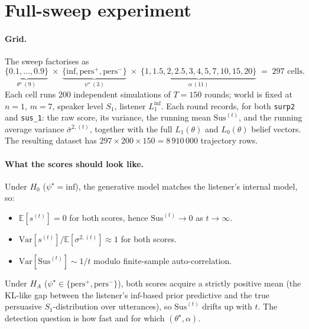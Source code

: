\documentclass[11pt]{article}
\newcommand{\LZero}{L_0}
\newcommand{\SOne}{S_1}
\newcommand{\LOne}{L_1}
\newcommand{\Var}{\mathrm{Var}}
\newcommand{\E}{\mathbb{E}}
\newcommand{\Inffn}{\mathrm{inf}}
\begin{document}
\section{Full-sweep experiment}

\paragraph{Grid.} The sweep factorises as
\[
    \underbrace{\{0.1, \ldots, 0.9\}}_{\theta^{\star}\,(9)}
    \;\times\;
    \underbrace{\{\Inffn, \text{pers}^{+}, \text{pers}^{-}\}}_{\psi^{\star}\,(3)}
    \;\times\;
    \underbrace{\{1, 1.5, 2, 2.5, 3, 4, 5, 7, 10, 15, 20\}}_{\alpha\,(11)}
    \;=\; 297 \text{ cells.}
\]
Each cell runs 200 independent simulations of $T = 150$ rounds; world is
fixed at $n = 1$, $m = 7$, speaker level $\SOne$, listener
$\LOne^{\Inffn}$. Each round records, for both \texttt{surp2} and
\texttt{sus\_1}: the raw score, its variance, the running mean
$\mathrm{Sus}^{(t)}$, and the running average variance
$\bar{\sigma}^{2,(t)}$, together with the full $\LOne(\theta)$ and
$\LZero(\theta)$ belief vectors. The resulting dataset has
$297 \times 200 \times 150 = 8\,910\,000$ trajectory rows.

\paragraph{What the scores should look like.} Under $H_0$
($\psi^{\star} = \Inffn$), the generative model matches the listener's
internal model, so:
\begin{itemize}[leftmargin=1.4em]
    \item $\E[s^{(t)}] = 0$ for both scores, hence $\mathrm{Sus}^{(t)} \to 0$ as $t \to \infty$.
    \item $\Var\!\left[s^{(t)}\right] / \E\!\left[\sigma^{2,(t)}\right] \approx 1$ for both scores.
    \item $\Var\!\left[\mathrm{Sus}^{(t)}\right] \sim 1/t$ modulo finite-sample auto-correlation.
\end{itemize}
Under $H_A$ ($\psi^{\star} \in \{\text{pers}^{+}, \text{pers}^{-}\}$), both
scores acquire a strictly positive mean (the KL-like gap between the
listener's $\Inffn$-based prior predictive and the true persuasive
$\SOne$-distribution over utterances), so $\mathrm{Sus}^{(t)}$ drifts up
with $t$. The detection question is how fast and for which $(\theta^{\star}, \alpha)$.
\end{document}

